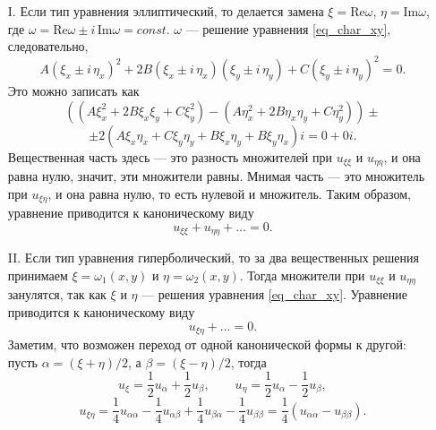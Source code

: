 \documentclass[12pt,a5paper]{book}
\begin{document}
	\begin{itemize}
		\item [I.] Если тип уравнения эллиптический, то делается замена $\xi = \text{Re}\omega$, $\eta = \text{Im}\omega$, где $\omega = \text{Re}\omega \pm i\,\text{Im}\omega = const$. $\omega$ --- решение уравнения \eqref{eq_char_xy}, следовательно,
		\begin{equation*}
			A\left(\xi_x \pm i\,\eta_x\right)^2 + 2B\left(\xi_x \pm i\,\eta_x\right)\left(\xi_y \pm i\,\eta_y\right) + C\left(\xi_y \pm i\,\eta_y\right)^2 = 0.
		\end{equation*}
		Это можно записать как
		\begin{equation*}
			\left(\left(A\xi^2_x + 2B\xi_x\xi_y + C\xi^2_y\right) - \left(A\eta^2_x + 2B\eta_x\eta_y + C\eta^2_y\right)\right) \pm
		\end{equation*}
		\begin{equation*}
			\pm 2\left(A\xi_x\eta_x + C\xi_y\eta_y + B\xi_x\eta_y + B\xi_y\eta_x\right)i = 0+0i.
		\end{equation*}
		Вещественная часть здесь --- это разность множителей при $u_{\xi\xi}$ и $u_{\eta\eta}$, и она равна нулю, значит, эти множители равны. Мнимая часть --- это множитель при $u_{\xi\eta}$, и она равна нулю, то есть нулевой и множитель. Таким образом, уравнение приводится к каноническому виду
		\begin{equation*}
			u_{\xi\xi} + u_{\eta\eta} + \dots = 0.
		\end{equation*}
		\item [II.] Если тип уравнения гиперболический, то за два вещественных решения принимаем $\xi = \omega_1(x,y)$ и $\eta = \omega_2(x,y)$. Тогда множители при $u_{\xi\xi}$ и $u_{\eta\eta}$ занулятся, так как $\xi$ и $\eta$ --- решения уравнения \eqref{eq_char_xy}. Уравнение приводится к каноническому виду
		\begin{equation*}
			u_{\xi\eta} + \dots = 0.
		\end{equation*}
		Заметим, что возможен переход от одной канонической формы к другой: пусть $\alpha = (\xi + \eta)/2$, а $\beta = (\xi - \eta)/2$, тогда
		\begin{equation*}
			u_\xi = \frac{1}{2}u_\alpha + \frac{1}{2}u_\beta, \qquad u_\eta = \frac{1}{2}u_\alpha - \frac{1}{2}u_\beta,
		\end{equation*}
		\begin{equation*}
			u_{\xi\eta} = \frac{1}{4}u_{\alpha\alpha} - \frac{1}{4}u_{\alpha\beta} + \frac{1}{4}u_{\beta\alpha} - \frac{1}{4}u_{\beta\beta} = \frac{1}{4}\left(u_{\alpha\alpha} - u_{\beta\beta}\right).

\end{equation*}
\end{itemize}
\end{document}
